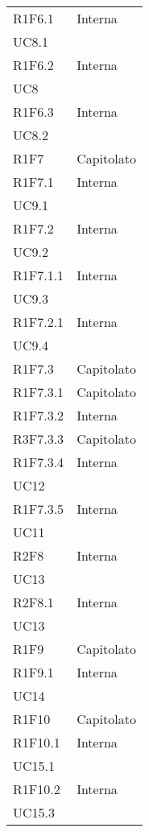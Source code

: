 \begin{longtable}{|C{6.5cm}|C{6.5cm}|}
	R1F6.1 & \centering Interna \\ UC8.1 \tabularnewline
	
	R1F6.2 & \centering Interna \\ UC8 \tabularnewline
	
	R1F6.3 & \centering Interna \\ UC8.2 \tabularnewline
	
	R1F7 & Capitolato \\
	
	R1F7.1 & \centering Interna \\ UC9.1 \tabularnewline
	
	R1F7.2 &  \centering Interna \\ UC9.2 \tabularnewline
	
	R1F7.1.1 & \centering Interna \\ UC9.3 \tabularnewline
	
	R1F7.2.1 &   \centering Interna \\ UC9.4 \tabularnewline
	
	R1F7.3 &   Capitolato \\
	
	R1F7.3.1 &  Capitolato \\
	
	R1F7.3.2 &  Interna \\
	
	R3F7.3.3 &  Capitolato \\
	
	R1F7.3.4 &  \centering Interna \\ UC12 \tabularnewline
	
	R1F7.3.5 & \centering Interna \\ UC11 \tabularnewline
	
	R2F8 & \centering Interna \\ UC13 \tabularnewline
	
	R2F8.1 & \centering Interna \\ UC13 \tabularnewline
	
	R1F9 &  Capitolato \\	
	
	R1F9.1 & \centering Interna \\ UC14 \tabularnewline
	
	R1F10 & Capitolato \\
	
	R1F10.1 &  \centering Interna \\ UC15.1 \tabularnewline
	
	R1F10.2 & \centering Interna \\ UC15.3 \tabularnewline
	

\end{longtable}
